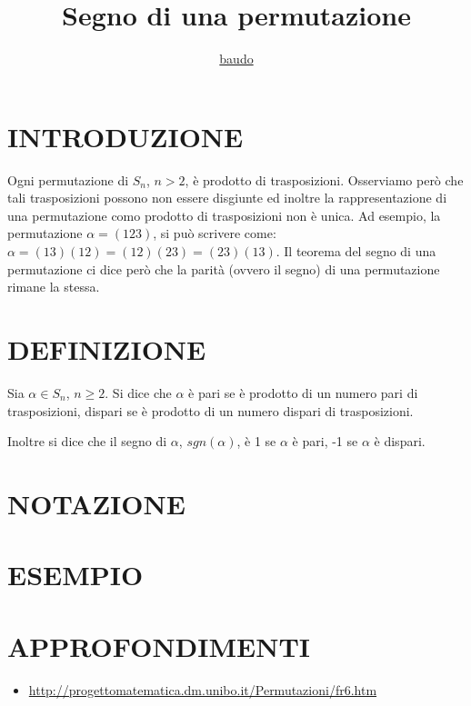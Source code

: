 \documentclass[a4paper,10pt]{article}
\title{Segno di una permutazione}
\author{\href{https://www.baudo.hol.es}{baudo}}
\begin{document}
\maketitle

\section{INTRODUZIONE}
Ogni permutazione di $S_n$, $n>2$, è prodotto di trasposizioni. Osserviamo però che tali trasposizioni possono non essere
disgiunte ed inoltre la rappresentazione di una permutazione como prodotto di trasposizioni non è unica. Ad esempio, la permutazione
$\alpha=(123)$, si può scrivere come: $\alpha=(13)(12)=(12)(23)=(23)(13)$. Il teorema del segno di una permutazione ci dice
però che la parità (ovvero il segno) di una permutazione rimane la stessa.

\section{DEFINIZIONE}
Sia $\alpha \in S_n$, $n \geq 2$. Si dice che $\alpha$ è pari se è prodotto di un numero pari di trasposizioni, dispari se è prodotto di un 
numero dispari di trasposizioni.

Inoltre si dice che il segno di $\alpha$, $sgn(\alpha)$, è 1 se $\alpha$ è pari, -1 se $\alpha$ è dispari.

\section{NOTAZIONE}

\section{ESEMPIO}

\section{APPROFONDIMENTI}
\begin{itemize}
 \item \href{http://progettomatematica.dm.unibo.it/Permutazioni/fr6.htm}{http://progettomatematica.dm.unibo.it/Permutazioni/fr6.htm}
\end{itemize}
\end{document}
